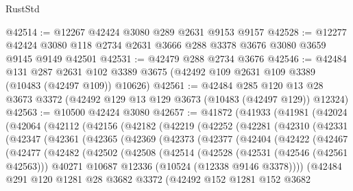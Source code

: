 \begin{lexlean}{RustStd}
\begin{coremodule}
@42514 := @12267 @42424 @3080 @289 @2631 @9153 @9157
@42528 := @12277 @42424 @3080 @118 @2734 @2631 @3666 @288 @3378 @3676 @3080 @3659 @9145 @9149 @42501
@42531 := @42479 @288 @2734 @3676
@42546 := @42484
    @131
    @287
    @2631
    @102
    @3389
    @3675
    (@42492 @109 @2631 @109 @3389 (@10483 (@42497 @109)) @10626)
@42561 := @42484
    @285
    @120
    @13
    @28
    @3673
    @3372
    (@42492 @129 @13 @129 @3673 (@10483 (@42497 @129)) @12324)
@42563 := @10500 @42424 @3080
@42657 := @41872
    (@41933
      (@41981
        (@42024
          (@42064
            (@42112
              (@42156
                (@42182
                  (@42219
                    (@42252
                      (@42281
                        (@42310
                          (@42331
                            (@42347
                              (@42361
                                (@42365
                                  (@42369
                                    (@42373
                                      (@42377
                                        (@42404
                                          (@42422
                                            (@42467
                                              (@42477
                                                (@42482
                                                  (@42502
                                                    (@42508
                                                      (@42514
                                                        (@42528
                                                          (@42531 (@42546 (@42561 @42563)))
                                                          @40271
                                                          @10687
                                                          @12336
                                                          (@10524 (@12338 @9146 @3378))))
                                                      (@42484
                                                        @291
                                                        @120
                                                        @1281
                                                        @28
                                                        @3682
                                                        @3372
                                                        (@42492
                                                          @152
                                                          @1281
                                                          @152
                                                          @3682

\end{coremodule}
\end{lexlean}
